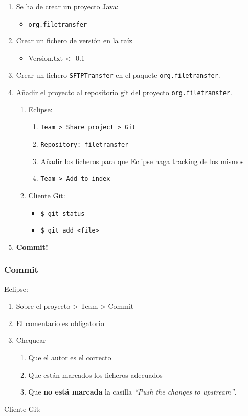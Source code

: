 \begin{enumerate}
\item
  Se ha de crear un proyecto Java:
  \begin{itemize}
  \item
    \texttt{org.filetransfer}
  \end{itemize}
\item
  Crear un fichero de versión en la raíz
  \begin{itemize}
  \item
    Version.txt \textless{}- 0.1
  \end{itemize}
\item
  Crear un fichero \texttt{SFTPTransfer} en el paquete
  \texttt{org.filetransfer}.
\item
  Añadir el proyecto al repositorio git del proyecto
  \texttt{org.filetransfer}.
  \begin{enumerate}
  \item
    Eclipse:
    \begin{enumerate}
    \item
      \texttt{Team \textgreater{} Share project \textgreater{} Git}
    \item
      \texttt{Repository: filetransfer}
    \item
      Añadir los ficheros para que Eclipse haga tracking de los mismos
    \item
      \texttt{Team \textgreater{} Add to index}
    \end{enumerate}
  \item
    Cliente Git:
    \begin{itemize}
    \item
      \texttt{\$ git status}
    \item
      \texttt{\$ git add \textless{}file\textgreater{}}
    \end{itemize}
  \end{enumerate}
\item
  \textbf{Commit!}
\end{enumerate}
\subsubsection{Commit}

Eclipse:

\begin{enumerate}
\item
  Sobre el proyecto \textgreater{} Team \textgreater{} Commit
\item
  El comentario es obligatorio
\item
  Chequear
  \begin{enumerate}
  \item
    Que el autor es el correcto
  \item
    Que están marcados los ficheros adecuados
  \item
    Que \textbf{no está marcada} la casilla \emph{``Push the changes to
    upstream''}.
  \end{enumerate}
\end{enumerate}
Cliente Git:

